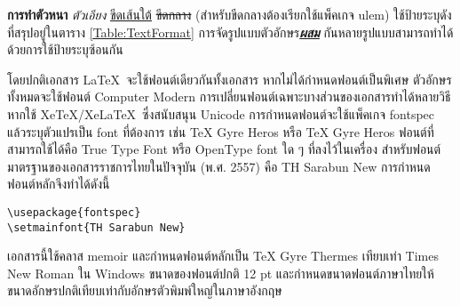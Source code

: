 \textbf{การทำตัวหนา} \textit{ตัวเอียง} \underline{ขีดเส้นใต้} \sout{ขีดกลาง} (สำหรับขีดกลางต้องเรียกใช้แพ็คเกจ ulem) ใช้ป้ายระบุดังที่สรุปอยู่ในตาราง \ref{Table:TextFormat} การจัดรูปแบบตัวอักษร\textbf{\underline{\textit{ผสม}}} กันหลายรูปแบบสามารถทำได้ด้วยการใช้ป้ายระบุซ้อนกัน

โดยปกติเอกสาร \LaTeX~จะใช้ฟอนต์เดียวกันทั้งเอกสาร หากไม่ได้กำหนดฟอนต์เป็นพิเศษ ตัวอักษรทั้งหมดจะใช้ฟอนต์ Computer Modern
การเปลี่ยนฟอนต์เฉพาะบางส่วนของเอกสารทำได้หลายวิธี หากใช้ Xe\TeX/Xe\LaTeX~ซึ่งสนับสนุน Unicode การกำหนดฟอนต์จะใช้แพ็คเกจ fontspec แล้วระบุตัวแปรเป็น font ที่ต้องการ เช่น {TeX Gyre Heros} หรือ {TeX Gyre Heros}
ฟอนต์ที่สามารถใช้ได้คือ True Type Font หรือ OpenType font ใด ๆ ที่ลงไว้ในเครื่อง สำหรับฟอนต์มาตรฐานของเอกสารราชการไทยในปัจจุบัน (พ.ศ. 2557) คือ TH Sarabun New 
การกำหนดฟอนต์หลักจึงทำได้ดังนี้
\clearpage
\begin{lstlisting}[numbers=none]
\usepackage{fontspec}
\setmainfont{TH Sarabun New}
\end{lstlisting}

เอกสารนี้ใช้คลาส memoir และกำหนดฟอนต์หลักเป็น TeX Gyre Thermes เทียบเท่า Times New Roman ใน Windows ขนาดของฟอนต์ปกติ 12 pt
และกำหนดขนาดฟอนต์ภาษาไทยให้ขนาดอักษรปกติเทียบเท่ากับอักษรตัวพิมพ์ใหญ่ในภาษาอังกฤษ

